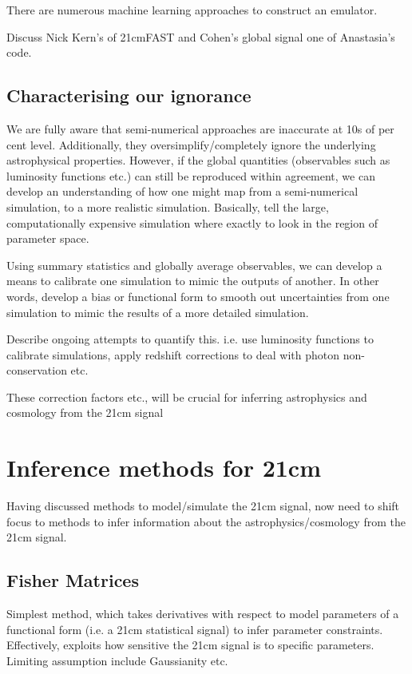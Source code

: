 There are numerous machine learning approaches to construct an emulator.

Discuss Nick Kern's of 21cmFAST and Cohen's global signal one of Anastasia's code.

\subsection{Characterising our ignorance}

We are fully aware that semi-numerical approaches are inaccurate at 10s of per cent level. Additionally, they oversimplify/completely ignore the underlying astrophysical properties. However, if the global quantities (observables such as luminosity functions etc.) can still be reproduced within agreement, we can develop an understanding of how one might map from a semi-numerical simulation, to a more realistic simulation. Basically, tell the large, computationally expensive simulation where exactly to look in the region of parameter space.

Using summary statistics and globally average observables, we can develop a means to calibrate one simulation to mimic the outputs of another. In other words, develop a bias or functional form to smooth out uncertainties from one simulation to mimic the results of a more detailed simulation.

Describe ongoing attempts to quantify this. i.e. use luminosity functions to calibrate simulations, apply redshift corrections to deal with photon non-conservation etc.

These correction factors etc., will be crucial for inferring astrophysics and cosmology from the 21cm signal


\section{Inference methods for 21cm}

Having discussed methods to model/simulate the 21cm signal, now need to shift focus to methods to infer information about the astrophysics/cosmology from the 21cm signal.

\subsection{Fisher Matrices}

Simplest method, which takes derivatives with respect to model parameters of a functional form (i.e. a 21cm statistical signal) to infer parameter constraints. Effectively, exploits how sensitive the 21cm signal is to specific parameters. Limiting assumption include Gaussianity etc.


